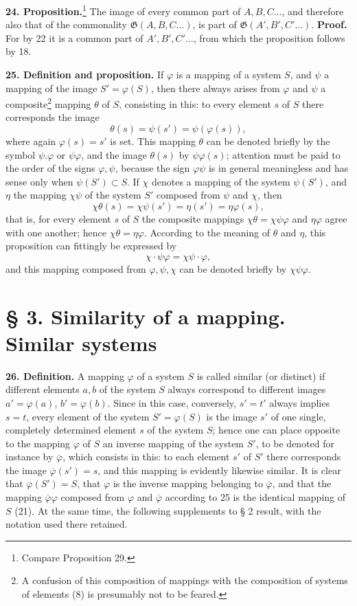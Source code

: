 \documentclass[11pt]{article}
\newcommand{\Gf}{\mathfrak{G}}
\newcommand{\partof}{\mathrel{\subset}}
\begin{document}
\noindent\textbf{24. Proposition.}\footnote{Compare Proposition 29.} The image of every common part of $A,B,C\ldots$, and therefore also that of the commonality $\Gf(A,B,C\ldots)$, is part of $\Gf(A',B',C'\ldots)$. \textbf{Proof.} For by 22 it is a common part of $A',B',C'\ldots$, from which the proposition follows by 18.

\noindent\textbf{25. Definition and proposition.} If $\varphi$ is a mapping of a system $S$, and $\psi$ a mapping of the image $S'=\varphi(S)$, then there always arises from $\varphi$ and $\psi$ a composite\footnote{A confusion of this composition of mappings with the composition of systems of elements (8) is presumably not to be feared.} mapping $\theta$ of $S$, consisting in this: to every element $s$ of $S$ there corresponds the image
\[
\theta(s)=\psi(s')=\psi(\varphi(s)),
\]
where again $\varphi(s)=s'$ is set. This mapping $\theta$ can be denoted briefly by the symbol $\psi.\varphi$ or $\psi\varphi$, and the image $\theta(s)$ by $\psi\varphi(s)$; attention must be paid to the order of the signs $\varphi,\psi$, because the sign $\varphi\psi$ is in general meaningless and has sense only when $\psi(S')\partof S$. If $\chi$ denotes a mapping of the system $\psi(S')$, and $\eta$ the mapping $\chi\psi$ of the system $S'$ composed from $\psi$ and $\chi$, then
\[
\chi\theta(s)=\chi\psi(s')=\eta(s')=\eta\varphi(s),
\]
that is, for every element $s$ of $S$ the composite mappings $\chi\theta=\chi\psi\varphi$ and $\eta\varphi$ agree with one another; hence $\chi\theta=\eta\varphi$. According to the meaning of $\theta$ and $\eta$, this proposition can fittingly be expressed by
\[
\chi\cdot\psi\varphi=\chi\psi\cdot\varphi,
\]
and this mapping composed from $\varphi,\psi,\chi$ can be denoted briefly by $\chi\psi\varphi$.

\section*{§ 3. Similarity of a mapping. Similar systems}

\noindent\textbf{26. Definition.} A mapping $\varphi$ of a system $S$ is called similar (or distinct) if different elements $a,b$ of the system $S$ always correspond to different images $a'=\varphi(a)$, $b'=\varphi(b)$. Since in this case, conversely, $s'=t'$ always implies $s=t$, every element of the system $S'=\varphi(S)$ is the image $s'$ of one single, completely determined element $s$ of the system $S$; hence one can place opposite to the mapping $\varphi$ of $S$ an inverse mapping of the system $S'$, to be denoted for instance by $\overline{\varphi}$, which consists in this: to each element $s'$ of $S'$ there corresponds the image $\overline{\varphi}(s')=s$, and this mapping is evidently likewise similar. It is clear that $\overline{\varphi}(S')=S$, that $\varphi$ is the inverse mapping belonging to $\overline{\varphi}$, and that the mapping $\overline{\varphi}\varphi$ composed from $\varphi$ and $\overline{\varphi}$ according to 25 is the identical mapping of $S$ (21). At the same time, the following supplements to § 2 result, with the notation used there retained.
\end{document}
